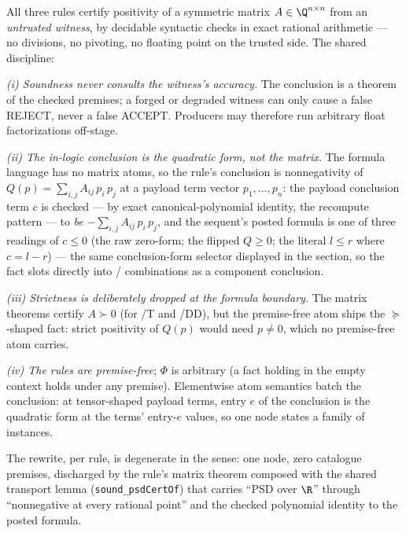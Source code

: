 

\begin{brecipe}
\label{rec:psd-preamble}
All three rules certify positivity of a symmetric matrix
$A \in \Q^{n\times n}$ from an \emph{untrusted witness}, by decidable
syntactic checks in exact rational arithmetic --- no divisions, no
pivoting, no floating point on the trusted side. The shared discipline:

\emph{(i) Soundness never consults the witness's accuracy.} The
conclusion is a theorem of the checked premises; a forged or degraded
witness can only cause a false REJECT, never a false ACCEPT. Producers
may therefore run arbitrary float factorizations off-stage.

\emph{(ii) The in-logic conclusion is the quadratic form, not the
matrix.} The formula language has no matrix atoms, so the rule's
conclusion is nonnegativity of $Q(p) = \sum_{i,j} A_{ij}\,p_i\,p_j$ at
a payload term vector $p_1,\ldots,p_n$: the payload conclusion term $c$
is checked --- by exact canonical-polynomial identity, the recompute
pattern --- to \emph{be} $-\!\sum_{i,j} A_{ij}\,p_i\,p_j$, and the
sequent's posted formula is one of three readings of $c \leq 0$ (the
raw zero-form; the flipped $Q \geq 0$; the literal $l \leq r$ where
$c = l - r$) --- the same conclusion-form selector displayed in the
 section, so the fact slots directly into
/ combinations as a component
conclusion.

\emph{(iii) Strictness is deliberately dropped at the formula
boundary.} The matrix theorems certify $A \succ 0$ (for /T and /DD),
but the premise-free atom ships the $\succcurlyeq$-shaped fact: strict
positivity of $Q(p)$ would need $p \neq 0$, which no premise-free atom
carries.

\emph{(iv) The rules are premise-free}; $\Phi$ is arbitrary (a fact
holding in the empty context holds under any premise). Elementwise atom
semantics batch the conclusion: at tensor-shaped payload terms, entry
$e$ of the conclusion is the quadratic form at the terms' entry-$e$
values, so one node states a family of instances.

The rewrite, per rule, is degenerate in the 
sense: one node, zero catalogue premises, discharged by the rule's
matrix theorem composed with the shared transport lemma
(\texttt{sound\_psdCertOf}) that carries ``PSD over $\R$'' through
``nonnegative at every rational point'' and the checked polynomial
identity to the posted formula.
\end{brecipe}

